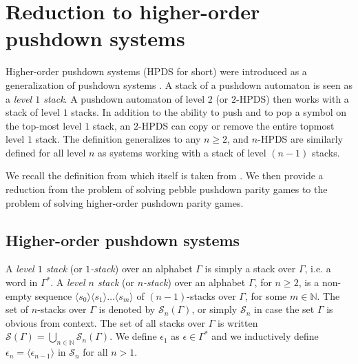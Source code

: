 \documentclass[a4paper,UKenglish,cleveref, autoref, thm-restate]{lipics-v2021}
\newcommand{\N}{\mathbb{N}}
\begin{document}
\section{Reduction to higher-order pushdown systems}\label{section HPDA}




Higher-order pushdown systems (HPDS for short) were introduced as a 
generalization of pushdown systems \cite{aho1969nested,Gre70,maslov1976multilevel}. 
A stack of a pushdown automaton is seen as a {\em level $1$ stack}. 
A pushdown automaton of level $2$ (or $2$-HPDS) then works with a stack of level $1$ stacks. 
In addition to the ability to push
and to pop a symbol on the top-most level $1$ stack, an $2$-HPDS can copy or remove the entire topmost level $1$ stack. 
The definition generalizes to any $n \geq 2$, and $n$-HPDS are similarly defined for all level
$n$ as systems working with a stack of level $(n-1)$ stacks.



We recall the definition from \cite{cachat2007complexity} which itself is taken from \cite{knapik2002higher}. We then provide a
reduction from the problem of solving pebble pushdown parity games to the problem of solving
higher-order pushdown parity games.


\subsection{Higher-order pushdown systems}

A {\em level $1$ stack} (or {\em $1$-stack}) over an alphabet $\Gamma$ is 
simply a %
	stack over $\Gamma$, i.e. a word  in $\Gamma^*$.
A  {\em level $n$ stack} (or {\em $n$-stack}) over an alphabet $\Gamma$, for $n \geq 2$, is a 
non-empty sequence
$ \langle s_0 \rangle \langle s_1 \rangle \ldots \langle s_m \rangle$
of
$(n-1)$-stacks over $\Gamma$,
for some $m \in \N$.
The set of $n$-stacks over $\Gamma$ is denoted by $\mathscr{S}_n(\Gamma)$,
or simply $\mathscr{S}_n$ in case the set $\Gamma$ is obvious from context.
The set of all stacks over $\Gamma$ is written $\mathscr{S}(\Gamma) = \bigcup_{n\in \N} \mathscr{S}_n(\Gamma)$.
We define $\epsilon_{1}$ as
$\epsilon \in \Gamma^*$ and we inductively define 
$\epsilon_{n} = \langle \epsilon_{n-1} \rangle$ in $\mathscr{S}_n$ for all $n > 1$.
\end{document}
